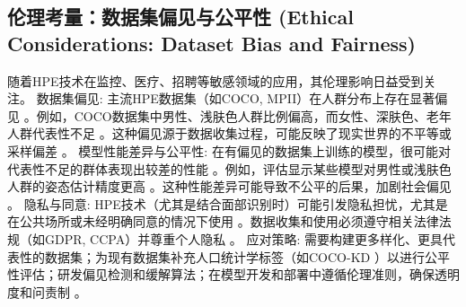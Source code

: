 \documentclass[12pt,a4paper]{article}
\begin{document}
\subsection{伦理考量：数据集偏见与公平性 (Ethical Considerations: Dataset Bias and Fairness)}
随着HPE技术在监控、医疗、招聘等敏感领域的应用，其伦理影响日益受到关注。
数据集偏见: 主流HPE数据集（如COCO, MPII）在人群分布上存在显著偏见 \cite{Dabra2021BiasHPE}。例如，COCO数据集中男性、浅肤色人群比例偏高，而女性、深肤色、老年人群代表性不足 \cite{Dabra2021BiasHPE}。这种偏见源于数据收集过程，可能反映了现实世界的不平等或采样偏差 \cite{Buolamwini2018GenderShades}。
模型性能差异与公平性: 在有偏见的数据集上训练的模型，很可能对代表性不足的群体表现出较差的性能 \cite{Dabra2021BiasHPE}。例如，评估显示某些模型对男性或浅肤色人群的姿态估计精度更高 \cite{Dabra2021BiasHPE}。这种性能差异可能导致不公平的后果，加剧社会偏见 \cite{Buolamwini2018GenderShades}。
隐私与同意: HPE技术（尤其是结合面部识别时）可能引发隐私担忧，尤其是在公共场所或未经明确同意的情况下使用 \cite{Hartzog2011DataBrokers}。数据收集和使用必须遵守相关法律法规（如GDPR, CCPA）并尊重个人隐私 \cite{Hartzog2011DataBrokers}。
应对策略: 需要构建更多样化、更具代表性的数据集；为现有数据集补充人口统计学标签（如COCO-KD \cite{Dabra2021BiasHPE}）以进行公平性评估；研发偏见检测和缓解算法；在模型开发和部署中遵循伦理准则，确保透明度和问责制 \cite{Dabra2021BiasHPE}。
\end{document}
